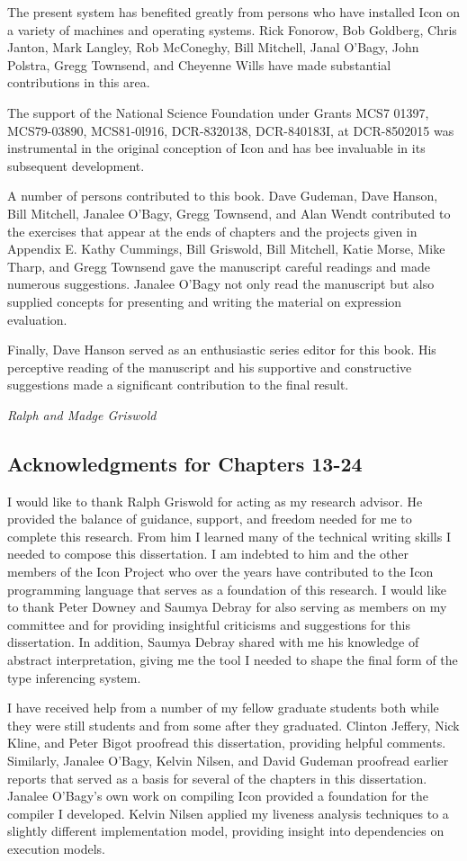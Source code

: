 The present system has benefited greatly from persons who have
installed Icon on a variety of machines and operating systems. Rick
Fonorow, Bob Goldberg, Chris Janton, Mark Langley, Rob McConeghy, Bill
Mitchell, Janal O'Bagy, John Polstra, Gregg Townsend, and Cheyenne
Wills have made substantial contributions in this area.

The support of the National Science Foundation under Grants MCS7
01397, MCS79-03890, MCS81-0l916, DCR-8320138, DCR-840183I, at
DCR-8502015 was instrumental in the original conception of Icon and
has bee invaluable in its subsequent development.

A number of persons contributed to this book. Dave Gudeman, Dave
Hanson, Bill Mitchell, Janalee O'Bagy, Gregg Townsend, and Alan Wendt
contributed to the exercises that appear at the ends of chapters and
the projects given in Appendix E. Kathy Cummings, Bill Griswold, Bill
Mitchell, Katie Morse, Mike Tharp, and Gregg Townsend gave the
manuscript careful readings and made numerous suggestions. Janalee
O'Bagy not only read the manuscript but also supplied concepts for
presenting and writing the material on expression evaluation.

Finally, Dave Hanson served as an enthusiastic series editor for this
book. His perceptive reading of the manuscript and his supportive
and constructive suggestions made a significant contribution to the
final result.

\hfill {\em Ralph and Madge Griswold}


\subsection*{Acknowledgments for Chapters 13-24}

I would like to thank Ralph Griswold for acting as my research
advisor. He provided the balance of guidance, support, and freedom
needed for me to complete this research. From him I learned many of
the technical writing skills I needed to compose this dissertation. I
am indebted to him and the other members of the Icon Project who over
the years have contributed to the Icon programming language that
serves as a foundation of this research. I would like to thank Peter
Downey and Saumya Debray for also serving as members on my committee
and for providing insightful criticisms and suggestions for this
dissertation. In addition, Saumya Debray shared with me his knowledge
of abstract interpretation, giving me the tool I needed to shape the
final form of the type inferencing system.

I have received help from a number of my fellow graduate students
both while they were still students and from some after they
graduated. Clinton Jeffery, Nick Kline, and Peter Bigot proofread this
dissertation, providing helpful comments. Similarly, Janalee O'Bagy,
Kelvin Nilsen, and David Gudeman proofread earlier reports that served
as a basis for several of the chapters in this dissertation. Janalee
O'Bagy's own work on compiling Icon provided a foundation for the
compiler I developed. Kelvin Nilsen applied my liveness analysis
techniques to a slightly different implementation model, providing
insight into dependencies on execution models.
